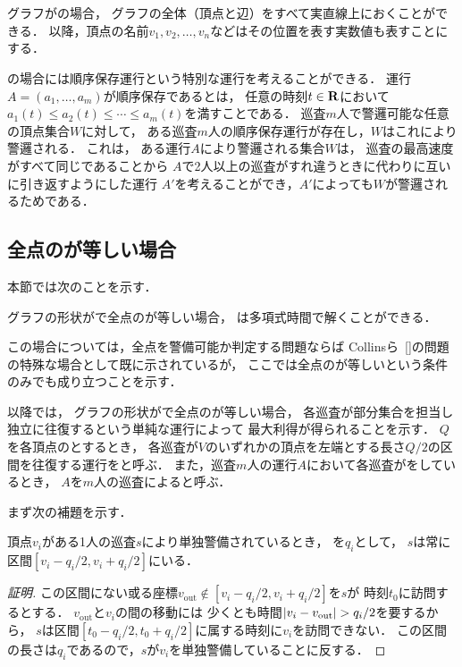 \section{{\graphLine}}
\label{section: line}

グラフが{\graphLine}の場合，
グラフの全体（頂点と辺）をすべて実直線上におくことができる．
以降，頂点の名前$v_1, v_2, \ldots, v_n$などはその位置を表す実数値も表すことにする．

{\graphLine}の場合には順序保存運行という特別な運行を考えることができる．
運行$A = (a_1, \ldots, a_m)$が順序保存であるとは，
任意の時刻$t \in \mathbf R$において
$a_1(t) \leq a_2(t) \leq \cdots \leq a_m(t)$を満すことである．
巡査$m$人で警邏可能な任意の頂点集合$W$に対して，
ある巡査$m$人の順序保存運行が存在し，$W$はこれにより警邏される．
これは，
ある運行$A$により警邏される集合$W$は，
巡査の最高速度がすべて同じであることから
$A$で2人以上の巡査がすれ違うときに代わりに互いに引き返すようにした運行
$A'$を考えることができ，$A'$によっても$W$が警邏されるためである．



\subsection{全点の{\idletime}が等しい場合}
\label{subsec:LineUnaryTimelimit}


本節では次のことを示す．

\begin{theo}
\label{theo:LineEqualTimelimit}
グラフの形状が{\graphLine}で全点の{\idletime}が等しい場合，
{\patProb}は多項式時間で解くことができる．
\end{theo}

この場合については，全点を警備可能か判定する問題ならば
Collinsら~\ref{}の問題の特殊な場合として既に示されているが，
ここでは全点の{\idletime}が等しいという条件のみでも成り立つことを示す．

以降では，
グラフの形状が{\graphLine}で全点の{\idletime}が等しい場合，
各巡査が部分集合を担当し独立に往復するという単純な運行によって
最大利得が得られることを示す．
$Q$を各頂点の{\idletime}とするとき，
各巡査が$V$のいずれかの頂点を左端とする長さ$Q/2$の区間を往復する運行を{\indSectOperation}と呼ぶ．
また，巡査$m$人の運行$A$において各巡査が{\indSectOperation}をしているとき，
$A$を$m$人の巡査による{\indSectOperation}と呼ぶ．


まず次の補題を示す．

\begin{lemm}
  \label{lemm:RangeOfPatrollerOnLine}
  頂点$v_i$がある1人の巡査$s$により単独警備されているとき，
  {\idletime}を$q_i$として，
  $s$は常に区間$[v_i - q_i/2, v_i + q_i/2]$にいる．
\end{lemm}
\begin{proof}[証明]
  \newcommand{\vout}{v_{\mathrm{out}}}
  この区間にない或る座標$\vout \notin [v_i - q_i/2, v_i + q_i/2]$を$s$が
  時刻$t_0$に訪問するとする．
  $\vout$と$v_i$の間の移動には
  少くとも時間$\abs{v_i - \vout} > q _i / 2$を要するから，
  $s$は区間$[t_0 - q _i / 2, t_0 + q _i / 2]$に属する時刻に$v_i$を訪問できない．
  この区間の長さは$
    q_i
  $であるので，$s$が$v _i$を単独警備していることに反する．
\end{proof}



